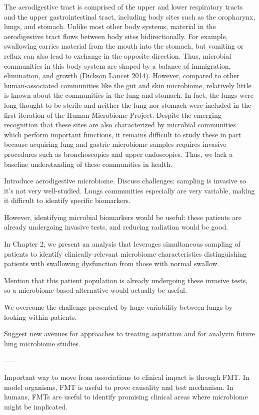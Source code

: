 The aerodigestive tract is comprised of the upper and lower respiratory tracts and the upper gastrointestinal tract, including body sites such as the oropharynx, lungs, and stomach.
Unlike most other body systems, material in the aerodigestive tract flows between body sites bidirectionally.
For example, swallowing carries material from the mouth into the stomach, but vomiting or reflux can also lead to exchange in the opposite direction.
Thus, microbial communities in this body system are shaped by a balance of immigration, elimination, and growth (Dickson Lancet 2014).
However, compared to other human-associated communities like the gut and skin microbiome, relatively little is known about the communities in the lung and stomach.
In fact, the lungs were long thought to be sterile and neither the lung nor stomach were included in the first iteration of the Human Microbiome Project.
Despite the emerging recognition that these sites are also characterized by microbial communities which perform important functions, it remains difficult to study these in part because acquiring lung and gastric microbiome samples requires invasive procedures such as bronchoscopies and upper endoscopies.
Thus, we lack a baseline understanding of these communities in health.

Introduce aerodigestive microbiome. Discuss challenges: sampling is invasive so it's not very well-studied. Lungs communities especially are very variable, making it difficult to identify specific biomarkers.

However, identifying microbial biomarkers would be useful: these patients are already undergoing invasive tests, and reducing radiation would be good.

In Chapter 2, we present an analysis that leverages simultaneous sampling of patients to identify clinically-relevant microbiome characteristics distinguishing patients with swallowing dysfunction from those with normal swallow.

Mention that this patient population is already undergoing these invasive tests, so a microbiome-based alternative would actually be useful.

We overcome the challenge presented by huge variability between lungs by looking within patients.

Suggest new avenues for approaches to treating aspiration and for analyzin future lung microbiome studies.

-----

Important way to move from associations to clinical impact is through FMT. In model organisms, FMT is useful to prove causality and test mechanism. In humans, FMTs are useful to identify promising clinical areas where microbiome might be implicated.

